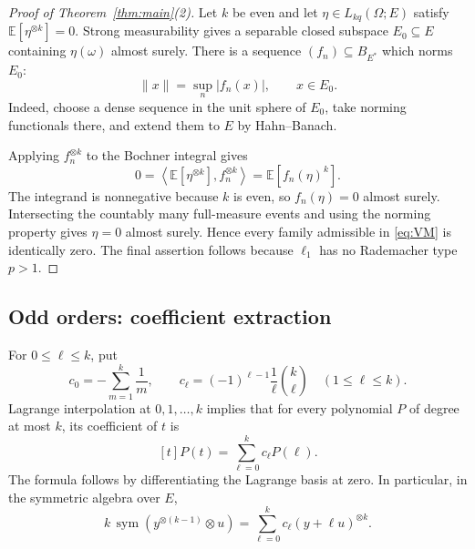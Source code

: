 \documentclass[11pt]{article}
\newcommand{\E}{\mathbb E}
\newcommand{\sym}{\operatorname{sym}}
\begin{document}
\begin{proof}[Proof of Theorem~\ref{thm:main}(2)]
Let $k$ be even and let $\eta\in L_{kq}(\Omega;E)$ satisfy
$\E[\eta^{\otimes k}]=0$.  Strong measurability gives a separable closed
subspace $E_0\subseteq E$ containing $\eta(\omega)$ almost surely.  There is a
sequence $(f_n)\subseteq B_{E^*}$ which norms $E_0$:
\[
 \|x\|=\sup_n|f_n(x)|,\qquad x\in E_0.
\]
Indeed, choose a dense sequence in the unit sphere of $E_0$, take norming
functionals there, and extend them to $E$ by Hahn--Banach.

Applying $f_n^{\otimes k}$ to the Bochner integral gives
\[
 0=\left\langle\E[\eta^{\otimes k}],f_n^{\otimes k}\right\rangle
  =\E[f_n(\eta)^k].
\]
The integrand is nonnegative because $k$ is even, so $f_n(\eta)=0$ almost
surely.  Intersecting the countably many full-measure events and using the
norming property gives $\eta=0$ almost surely.  Hence every family admissible
in \eqref{eq:VM} is identically zero.  The final assertion follows because
$\ell_1$ has no Rademacher type $p>1$.
\end{proof}

\subsection*{Odd orders: coefficient extraction}

For $0\le\ell\le k$, put
\begin{equation}\label{eq:coefficients}
 c_0=-\sum_{m=1}^k\frac1m,
 \qquad
 c_\ell=(-1)^{\ell-1}\frac1\ell\binom{k}{\ell}
 \quad(1\le\ell\le k).
\end{equation}
Lagrange interpolation at $0,1,\ldots,k$ implies that for every polynomial
$P$ of degree at most $k$, its coefficient of $t$ is
\begin{equation}\label{eq:extract}
 [t]P(t)=\sum_{\ell=0}^k c_\ell P(\ell).
\end{equation}
The formula follows by differentiating the Lagrange basis at zero.  In
particular, in the symmetric algebra over $E$,
\begin{equation}\label{eq:tensor-extract}
 k\,\sym(y^{\otimes(k-1)}\otimes u)
 =\sum_{\ell=0}^k c_\ell(y+\ell u)^{\otimes k}.
\end{equation}
\end{document}
